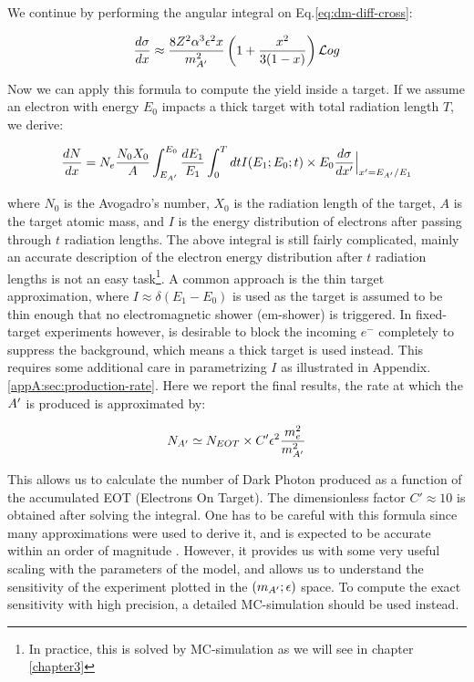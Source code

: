 We continue by performing the angular integral on Eq.\ref{eq:dm-diff-cross}:

\begin{equation}
  \label{eq:dm-diff-cross-int}
  \frac{d\sigma}{dx} \approx \frac{8 Z^2 \alpha^3 \epsilon^2 x}{m^2_{A'}} \left( 1 + \frac{x^2}{3(1-x)} \right) \mathcal{L}og 
\end{equation}

Now we can apply this formula to compute the yield inside a target. If we assume an electron with energy $E_0$ impacts a thick target with total radiation length $T$, we derive:

\begin{equation}
  \label{eq:dm-general-yield}
  \frac{dN}{dx} = N_e \frac{N_0 X_0}{A} \int_{E_{A'}}^{E_0} \frac{dE_1}{E_1} \int_0^T dt I(E_1;E_0;t) \times E_0 \frac{d\sigma}{dx'}\Big|_{x' = E_{A'}/E_1}
\end{equation}

where $N_0$ is the Avogadro's number, $X_0$ is the radiation length of the target, $A$ is the target atomic mass, and $I$ is the energy distribution of electrons after passing through $t$ radiation lengths. The above integral is still fairly complicated, mainly an accurate description of the electron energy distribution after $t$ radiation lengths is not an easy task\footnote{In practice, this is solved by MC-simulation as we will see in chapter \ref{chapter3}}. A common approach is the thin target approximation, where $I \approx \delta (E_1 - E_0)$ is used as the target is assumed to be thin enough that no electromagnetic shower (em-shower) is triggered. In fixed-target experiments however, is desirable to block the incoming $e^-$ completely to suppress the background, which means a thick target is used instead. This requires some additional care in parametrizing $I$ as illustrated in Appendix.\ref{appA:sec:production-rate}. Here we report the final results, the rate at which the $A'$ is produced is approximated by:

\begin{equation}
  \label{eq:dm-rate}
  N_{A'} \simeq N_{EOT} \times C' \epsilon^2 \frac{m_e^2}{m^2_{A'}}
\end{equation}

This allows us to calculate the number of Dark Photon produced as a function of the accumulated EOT (Electrons On Target). The dimensionless factor $C' \approx 10$ is obtained after solving  the integral. One has to be careful with this formula since many approximations were used to derive it, and is expected to be accurate within an order of magnitude \cite{jdb}. However, it provides us with some very useful scaling with the parameters of the model, and allows us to understand the sensitivity of the experiment plotted in the $(m_{A'};\epsilon)$ space. To compute the exact sensitivity with high precision, a detailed MC-simulation should be used instead.

